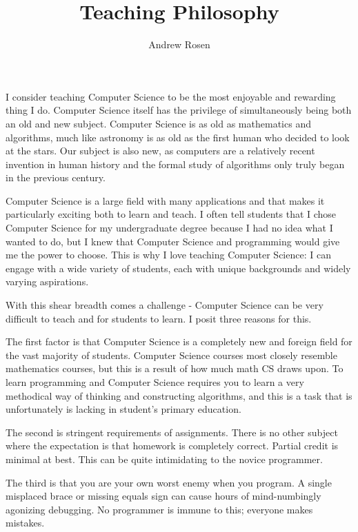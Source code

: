 \documentclass[10pt, a4paper]{article}
\author{Andrew Rosen}
\title{Teaching Philosophy}
\date{}
\begin{document}
\maketitle
	
I consider teaching Computer Science to be the most enjoyable and rewarding thing I do.
Computer Science itself has the privilege of simultaneously being both an old and new subject.
Computer Science is as old as mathematics and algorithms, much like astronomy is as old as the first human who decided to look at the stars.
Our subject is also new, as computers are a relatively recent invention in human history and the formal study of algorithms only truly began in the previous century.

Computer Science is a large field with many applications and that makes it particularly exciting both to learn and teach.
I often tell students that I chose Computer Science for my undergraduate degree because I had no idea what I wanted to do, but I knew that Computer Science and programming would give me the power to choose.
This is why I love teaching Computer Science:  I can engage with a wide variety of students, each with unique backgrounds and widely varying aspirations.

With this shear breadth comes a challenge - Computer Science can be very difficult to teach and for students to learn.
I posit three reasons for this.

The first factor is that Computer Science is a completely new and foreign field for the vast majority of students.
Computer Science courses most closely resemble mathematics courses, but this is a result of how much math CS draws upon.
To learn programming and Computer Science requires you to learn a very methodical way of thinking and constructing algorithms, and this is a task that is unfortunately is lacking in student's primary education.

The second is stringent requirements of assignments.
There is no other subject where the expectation is that homework is completely correct.
Partial credit is minimal at best.
This can be quite intimidating to the novice programmer.

The third is that you are your own worst enemy when you program.
A single misplaced brace or missing equals sign can cause hours of mind-numbingly agonizing debugging.
No programmer is immune to this; everyone makes mistakes.
\end{document}
